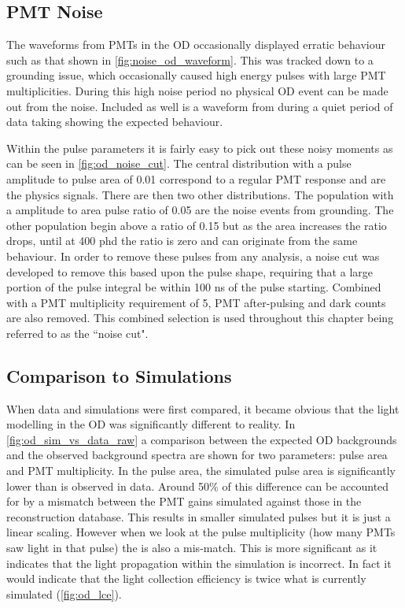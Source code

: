 \subsection{PMT Noise}
\par
The waveforms from PMTs in the OD occasionally displayed erratic behaviour such as that shown in \autoref{fig:noise_od_waveform}.
This was tracked down to a grounding issue, which occasionally caused high energy pulses with large PMT multiplicities.
During this high noise period no physical OD event can be made out from the noise.
Included as well is a waveform from during a quiet period of data taking showing the expected behaviour.



\par
Within the pulse parameters it is fairly easy to pick out these noisy moments as can be seen in \autoref{fig:od_noise_cut}.
The central distribution with a pulse amplitude to pulse area of 0.01 correspond to a regular PMT response and are the physics signals.
There are then two other distributions.
The population with a amplitude to area pulse ratio of 0.05 are the noise events from grounding.
The other population begin above a ratio of 0.15 but as the area increases the ratio drops, until at 400 phd the ratio is zero and can originate from the same behaviour.
In order to remove these pulses from any analysis, a noise cut was developed to remove this based upon the pulse shape, requiring that a large portion of the pulse integral be within 100 ns of the pulse starting.
Combined with a PMT multiplicity requirement of 5, PMT after-pulsing and dark counts are also removed.
This combined selection is used throughout this chapter being referred to as the ``noise cut".

\subsection{Comparison to Simulations}
\par

When data and simulations were first compared, it became obvious that the light modelling in the OD was significantly different to reality.
In \autoref{fig:od_sim_vs_data_raw} a comparison between the expected OD backgrounds and the observed background spectra are shown for two parameters: pulse area and PMT multiplicity.
In the pulse area, the simulated pulse area is significantly lower than is observed in data.
Around 50\% of this difference can be accounted for by a mismatch between the PMT gains simulated against those in the reconstruction database.
This results in smaller simulated pulses but it is just a linear scaling.
However when we look at the pulse multiplicity (how many PMTs saw light in that pulse) the is also a mis-match.
This is more significant as it indicates that the light propagation within the simulation is incorrect.
In fact it would indicate that the light collection efficiency is twice what is currently simulated (\autoref{fig:od_lce}).

